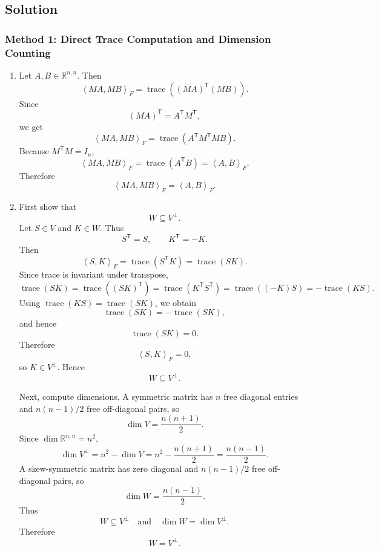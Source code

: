 \documentclass[12pt]{article}
\newcommand{\R}{\mathbb{R}}
\newcommand{\tr}{\operatorname{trace}}
\newcommand{\ipF}[2]{\left\langle #1,#2\right\rangle_F}
\newcommand{\T}{\mathsf{T}}
\begin{document}
\bigskip
\subsection{Solution}

\subsubsection{Method 1: Direct Trace Computation and Dimension Counting}
\begin{enumerate}[label=(\alph*)]
  \item Let $A,B\in\R^{n,n}$. Then
  \[
    \ipF{MA}{MB}
    =\tr((MA)^\T(MB)).
  \]
  Since
  \[
    (MA)^\T=A^\T M^\T,
  \]
  we get
  \[
    \ipF{MA}{MB}
    =\tr(A^\T M^\T M B).
  \]
  Because $M^\T M=I_n$,
  \[
    \ipF{MA}{MB}
    =\tr(A^\T B)
    =\ipF{A}{B}.
  \]
  Therefore
  \[
    \boxed{\ipF{MA}{MB}=\ipF{A}{B}.}
  \]

  \item First show that
  \[
    W\subseteq V^\perp.
  \]
  Let $S\in V$ and $K\in W$. Thus
  \[
    S^\T=S,
    \qquad
    K^\T=-K.
  \]
  Then
  \[
    \ipF{S}{K}=\tr(S^\T K)=\tr(SK).
  \]
  Since trace is invariant under transpose,
  \[
    \tr(SK)=\tr((SK)^\T)=\tr(K^\T S^\T)=\tr((-K)S)=-\tr(KS).
  \]
  Using $\tr(KS)=\tr(SK)$, we obtain
  \[
    \tr(SK)=-\tr(SK),
  \]
  and hence
  \[
    \tr(SK)=0.
  \]
  Therefore
  \[
    \ipF{S}{K}=0,
  \]
  so $K\in V^\perp$. Hence
  \[
    W\subseteq V^\perp.
  \]

  Next, compute dimensions. A symmetric matrix has $n$ free diagonal entries and $n(n-1)/2$ free off-diagonal pairs, so
  \[
    \dim V=\frac{n(n+1)}2.
  \]
  Since $\dim\R^{n,n}=n^2$,
  \[
    \dim V^\perp=n^2-\dim V
    =n^2-\frac{n(n+1)}2
    =\frac{n(n-1)}2.
  \]
  A skew-symmetric matrix has zero diagonal and $n(n-1)/2$ free off-diagonal pairs, so
  \[
    \dim W=\frac{n(n-1)}2.
  \]
  Thus
  \[
    W\subseteq V^\perp
    \quad\text{and}\quad
    \dim W=\dim V^\perp.
  \]
  Therefore
  \[
    \boxed{W=V^\perp.}
  \]
\end{enumerate}

\newpage
\end{document}

